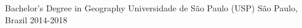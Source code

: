 
\cventry
  {Bachelor's Degree in Geography}
  {Universidade de São Paulo (USP)}
  {São Paulo, Brazil}
  {2014-2018}
  {}

